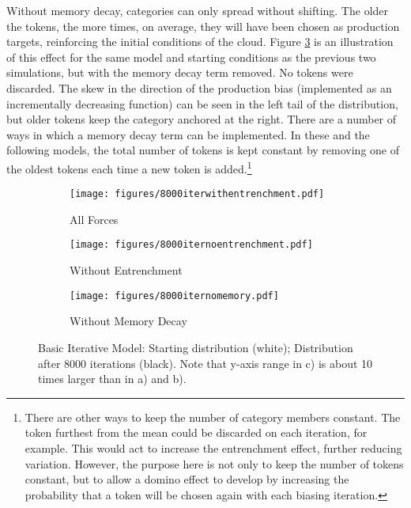 Without memory decay, categories can only spread without shifting.
The older the tokens, the more times, on average, they will have been
chosen as production targets, reinforcing the initial conditions of
the cloud. Figure \ref{fig:No-memory-decay:} is an illustration of
this effect for the same model and starting conditions as the previous
two simulations, but with the memory decay term removed. No tokens were
discarded. The skew in the direction of the production bias (implemented
as an incrementally decreasing function) can be seen in the left tail
of the distribution, but older tokens keep the category anchored at
the right. There are a number of ways in which a memory decay term
can be implemented. In these and the following models, the total
number of tokens is kept constant by removing one of the oldest tokens
each time a new token is added.\footnote{There are other ways to keep the number of category members constant.
The token furthest from the mean could be discarded on each iteration,
for example. This would act to increase the entrenchment effect, further
reducing variation. However, the purpose here is not only to keep
the number of tokens constant, but to allow a domino effect to develop
by increasing the probability that a token will be chosen again with
each biasing iteration. }

\begin{figure}[H]
    \begin{subfigure}[t]{.3\textwidth}
        \texttt{[image: figures/8000iterwithentrenchment.pdf]}
        \caption{\label{fig:Basic-Iterative-Model}All Forces}
    \end{subfigure}\hfill
    \begin{subfigure}[t]{.3\textwidth}
        \texttt{[image: figures/8000iternoentrenchment.pdf]}
        \caption{\label{fig:NoEntrenchment}Without Entrenchment}
    \end{subfigure}\hfill
    \begin{subfigure}[t]{.3\textwidth}
        \texttt{[image: figures/8000iternomemory.pdf]}
        \caption{\label{fig:No-memory-decay:}Without Memory Decay}
    \end{subfigure}
\caption{\label{fig:First Model param}Basic Iterative Model: Starting distribution
(white); Distribution after 8000 iterations (black). Note that y-axis
range in c) is about 10 times larger than in a) and b).}
\end{figure}


